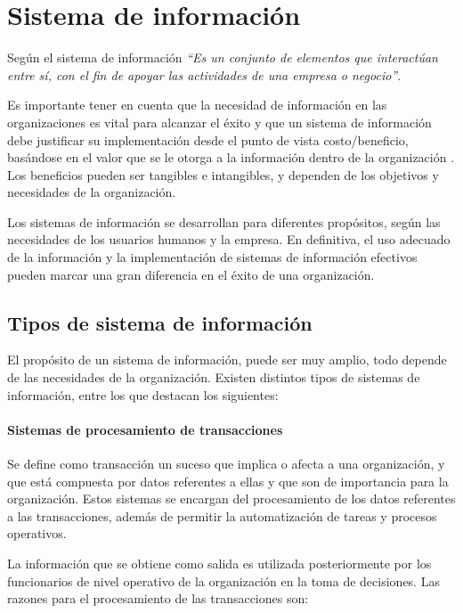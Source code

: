\section{Sistema de información }

Según\cite{kendall2005analisis} el sistema de información\textit{ “Es un conjunto de elementos que interactúan entre sí, con el fin de apoyar las actividades de una empresa o negocio”}.

Es importante tener en cuenta que la necesidad de información en las organizaciones es vital para alcanzar el éxito y que un sistema de información debe justificar su implementación desde el punto de vista costo/beneficio, basándose en el valor que se le otorga a la información dentro de la organización \cite{kendall2005analisis}. Los beneficios pueden ser tangibles e intangibles, y dependen de los objetivos y necesidades de la organización.

Los sistemas de información se desarrollan para diferentes propósitos, según las necesidades de los usuarios humanos y la empresa. En definitiva, el uso adecuado de la información y la implementación de sistemas de información efectivos pueden marcar una gran diferencia en el éxito de una organización.

\subsection{ Tipos de sistema de información}

El propósito de un sistema de información, puede ser muy amplio, todo depende de las necesidades de la organización. Existen distintos tipos de sistemas de información, entre los que destacan los siguientes\cite{kendall2005analisis}:

\setcounter{secnumdepth}{3}
\paragraph{Sistemas de procesamiento de transacciones}

Se define como transacción un suceso que implica o afecta a una organización, y que está compuesta por datos referentes a ellas y que son de importancia para la organización\cite{kendall2005analisis}. Estos sistemas se encargan del procesamiento de los datos referentes a las transacciones, además de permitir la automatización de tareas y procesos operativos. 

La información que se obtiene como salida es utilizada posteriormente por los funcionarios de nivel operativo de la organización en la toma de decisiones. Las razones para el procesamiento de las transacciones son:  

